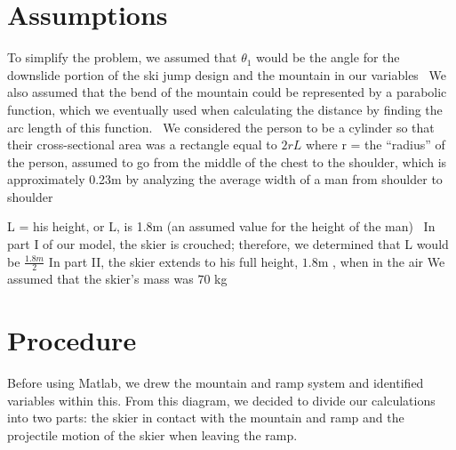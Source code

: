 \documentclass[]{IEEEphot}
\begin{document}
 \section{Assumptions}
 To simplify the problem, we assumed that $\theta_1$ would be the angle for the downslide portion of the ski jump design and the mountain in our variables
\
 We also assumed that the bend of the mountain could be represented by a parabolic function, which we eventually used when calculating the distance by finding the arc length of this function.
\
 We considered the person to be a cylinder so that their cross-sectional area was a rectangle equal to $2rL$
 where
 	r = the ``radius'' of the person, assumed to go from the middle of the chest to the shoulder, which is approximately 0.23m by analyzing the average width of a man from shoulder to shoulder

	L = his height, or L, is 1.8m (an assumed value for the height of the man)
\
In part I of our model, the skier is crouched; therefore, we determined that L would be $\frac{1.8m}{2}$
In part II, the skier extends to his full height, $1.8$m , when in the air
We assumed that the skier’s mass was $70$ kg




\section{Procedure}

Before using Matlab, we drew the mountain and ramp system and identified variables within this. From this diagram, we decided to divide our calculations into two parts: the skier in contact with the mountain and ramp and the projectile motion of the skier when leaving the ramp.
\end{document}
